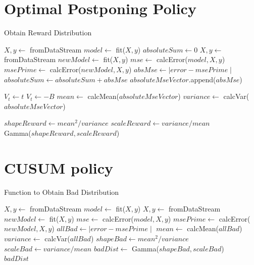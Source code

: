 \documentclass{mpaper}
\begin{document}




\begin{appendix}

\section{Optimal Postponing Policy}\label{rewarddist}
\begin{algorithm}[h]
\caption{Obtain Reward Distribution}
\begin{algorithmic}
    \State $X, y \gets$ fromDataStream
    \State $model \gets$ fit($X,y$)
    \State $absoluteSum \gets 0$
        \State $X, y \gets$ fromDataStream
        \State $newModel \gets$ fit($X,y$)
        \State $mse \gets$ calcError($model,X,y$)
        \State $msePrime \gets$ calcError($newModel,X,y$)
        \State $absMse \gets \mid error - msePrime \mid$
        \State $absoluteSum \gets absoluteSum + absMse$
        \State $absoluteMseVector$.append($absMse$)
        
            \State $V_t \gets t$
        \Else
            \State $V_t \gets -B$
        \EndIf
    \EndFor
    \State $mean \gets$ calcMean($absoluteMseVector$)
    \State $variance \gets$ calcVar($absoluteMseVector$)
    
    \State $shapeReward \gets mean^2/variance$
    \State $scaleReward \gets variance/mean$\\
    \Return Gamma($shapeReward, scaleReward$)
    
\EndFunction
\end{algorithmic}
\end{algorithm}

\section{CUSUM policy}\label{baddist}
\begin{algorithm}[h]
\caption{Function to Obtain Bad Distribution}
\begin{algorithmic}
    \State $X, y \gets$ fromDataStream
    \State $model \gets$ fit($X,y$)
        \State $X, y \gets$ fromDataStream
        \State $newModel \gets$ fit($X,y$)
        \State $mse \gets$ calcError($model,X,y$)
        \State $msePrime \gets$ calcError($newModel,X,y$)
        \State $allBad \gets \mid error - msePrime \mid$
    \EndFor
    \State $mean \gets$ calcMean($allBad$)
    \State $variance \gets$ calcVar($allBad$)
    \State $shapeBad \gets mean^2/variance$
    \State $scaleBad \gets variance/mean$
    \State $badDist \gets$ Gamma($shapeBad, scaleBad$)\\
    \Return $badDist$
\EndFunction
\end{algorithmic}
\end{algorithm}


\end{appendix}
\end{document}
